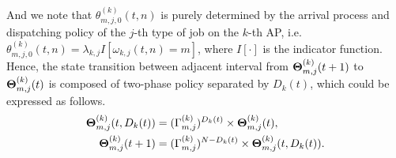 {    And we note that $\theta^{(k)}_{m,j,0}(t,n)$ is purely determined by the arrival process and dispatching policy of the $j$-th type of job on the $k$-th AP, i.e. $\theta^{(k)}_{m,j,0}(t,n) = \lambda_{k,j} I[\omega_{k,j}(t,n) = m]$, where $I[\cdot]$ is the indicator function.
    Hence, the state transition between adjacent interval from $\boldsymbol{\Theta}^{(k)}_{m,j}(t+1)$ to $\boldsymbol{\Theta}^{(k)}_{m,j}(t)$ is composed of two-phase policy separated by $D_k(t)$, which could be expressed as follows.
    \begin{align}
        \boldsymbol{\Theta}^{(k)}_{m,j}(t, D_{k}(t)) &= (\Gamma^{(k)}_{m,j})^{D_{k}(t)} \times \boldsymbol{\Theta}^{(k)}_{m,j}(t),
        \nonumber\\
        \boldsymbol{\Theta}^{(k)}_{m,j}({t+1}) &= (\Gamma^{(k)}_{m,j})^{N-D_{k}(t)} \times \boldsymbol{\Theta}^{(k)}_{m,j}(t, D_{k}(t)).
    \end{align}

}
